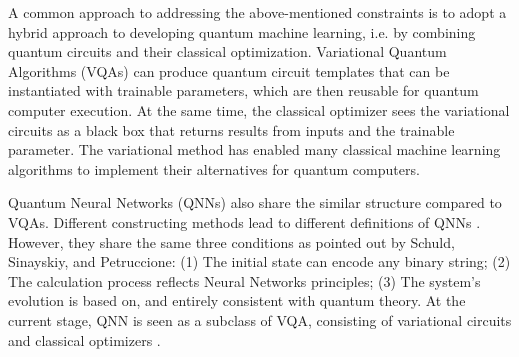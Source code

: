 A common approach to addressing the above-mentioned constraints is to adopt a hybrid approach to developing quantum machine learning, i.e. by combining quantum circuits and their classical optimization. 
Variational Quantum Algorithms (VQAs) \cite{cerezo2021variational} can produce quantum circuit templates that can be instantiated with trainable parameters, which are then reusable for quantum computer execution. 
At the same time, the classical optimizer sees the variational circuits as a black box that returns results from inputs and the trainable parameter. 
The variational method has enabled many classical machine learning algorithms to implement their alternatives for quantum computers.

Quantum Neural Networks (QNNs) \cite{altaisky2001quantum} also share the similar structure compared to VQAs. 
Different constructing methods lead to different definitions of QNNs \cite{paetznick2013} \cite{zhaoBuildingQuantumNeural2019} \cite{caoQuantumNeuronElementary2017}. 
However, they share the same three conditions as pointed out by \cite{schuldQuestQuantumNeural2014} Schuld, Sinayskiy, and Petruccione: 
(1) The initial state can encode any binary string;
(2) The calculation process reflects Neural Networks principles;
(3) The system's evolution is based on, and entirely consistent with quantum theory.
At the current stage, QNN is seen as a subclass of VQA, consisting of variational circuits and classical optimizers \cite{abbasPowerQuantumNeural2021}.


